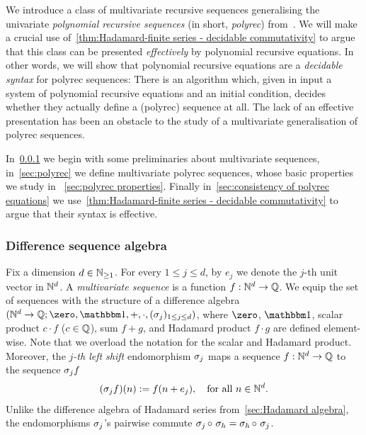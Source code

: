 We introduce a class of multivariate recursive sequences
generalising the univariate \emph{polynomial recursive sequences} (in short, \emph{polyrec})
from~\cite{Cadilhac:Mazowiecki:Paperman:Pilipczuk:Senizergues:ToCS:2021}.
%
We will make a crucial use of~\cref{thm:Hadamard-finite series - decidable commutativity}
to argue that this class can be presented \emph{effectively} by polynomial recursive equations.
%
In other words, we will show that polynomial recursive equations are a \emph{decidable syntax} for polyrec sequences:
%
There is an algorithm which, given in input a system of polynomial recursive equations and an initial condition,
decides whether they actually define a (polyrec) sequence at all.
%
The lack of an effective presentation
has been an obstacle to the study of a multivariate generalisation of polyrec sequences.

In~\cref{sec:shift algebra} we begin with some preliminaries about multivariate sequences,
in~\cref{sec:polyrec} we define multivariate polyrec sequences,
whose basic properties we study in ~\cref{sec:polyrec properties}.
%
Finally in~\cref{sec:consistency of polyrec equations} we use~\cref{thm:Hadamard-finite series - decidable commutativity}
to argue that their syntax is effective.

\subsubsection{Difference sequence algebra}
\label{sec:shift algebra}

Fix a dimension $d \in \mathbb N_{\geq 1}$.
%
For every $1 \leq j \leq d$,
by $e_j$ we denote the $j$-th unit vector in $\mathbb N^d$.
%
A \emph{multivariate sequence} is a function $f : \mathbb N^d \to \mathbb Q$.
%
We equip the set of sequences with the structure of a difference algebra
$\tuple{\N^d \to \Q; \zero, \one, {+}, {\cdot}, (\shift j)_{1 \leq j \leq d}}$,
where $\zero$, $\one$, scalar product $c \cdot f$ ($c \in \mathbb Q$),
sum $f + g$, and Hadamard product $f \cdot g$ are defined element-wise.
%
Note that we overload the notation for the scalar and Hadamard product.
%
Moreover, the \emph{$j$-th left shift} endomorphism $\sigma_{j}$ maps a sequence $f : \mathbb N^d \to \mathbb Q$
to the sequence $\sigma_{j} f$ \st
%
\begin{align*}
    (\sigma_{j} f)(n) := f(n + e_j),
    \quad \text{for all } n \in \mathbb N^d.
\end{align*}
%
Unlike the difference algebra of Hadamard series from~\cref{sec:Hadamard algebra},
the endomorphisms $\sigma_{j}$'s pairwise commute
$\shift j \circ \shift h = \shift h \circ \shift j$.

